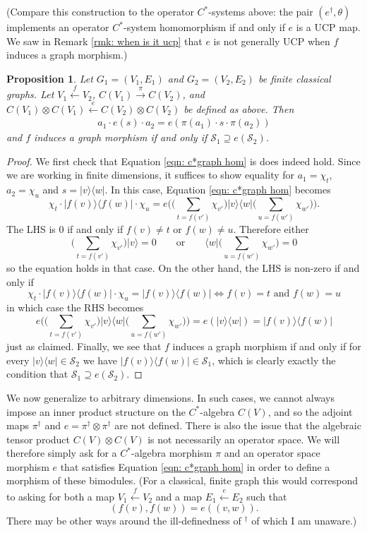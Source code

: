 \documentclass[12pt]{article}
\newtheorem{proposition}[theorem]{Proposition}
\theoremstyle{definition}
\newcommand{\mc}[1]{\mathcal{#1}}
\newcommand{\<}{\langle}
\renewcommand{\>}{\rangle}
\begin{document}
(Compare this construction to the operator $C^*$-systems above: the pair $(e^\dagger, \theta)$ implements an operator $C^*$-system homomorphism if and only if $e$ is a UCP map. We saw in Remark \ref{rmk: when is it ucp} that $e$ is not generally UCP when $f$ induces a graph morphism.)
\begin{proposition}
        Let $G_1 = (V_1, E_1)$ and $G_2 = (V_2, E_2)$ be finite classical graphs. Let $V_1 \overset{f}{\leftarrow} V_2$, $C(V_1) \overset{\pi}{\to} C(V_2)$, and $ C(V_1) \otimes C(V_1) \overset{e}{\leftarrow}  C(V_2) \otimes C(V_2)$ be defined as above. Then 
        \begin{align} \label{eqn: c*graph hom}
        a_1 \cdot e(s) \cdot a_2 = e(\pi(a_1) \cdot s \cdot \pi(a_2))
        \end{align}
        and $f$ induces a graph morphism if and only if $\mc S_1 \supseteq e(\mc S_2)$.
\end{proposition}
\begin{proof}
    We first check that Equation \ref{eqn: c*graph hom} is does indeed hold. Since we are working in finite dimensions, it suffices to show equality for $a_1 = \chi_t$, $a_2 = \chi_u$ and $s = |v\>\<w|$. In this case, Equation \ref{eqn: c*graph hom} becomes
    \[
    \chi_t \cdot |f(v)\>\<f(w)| \cdot \chi_u = e\bigg( \bigg( \sum_{t = f(v')} \chi_{v'}  \bigg) |v\>\<w| \bigg( \sum_{u = f(w')} \chi_{w'}\bigg)\bigg).
    \]
    The LHS is 0 if and only if $f(v) \ne t$ or $f(w) \ne u$. Therefore either 
    \[
    \bigg(\sum_{t = f(v')} \chi_{v'}  \bigg) |v\> = 0 \qquad \text{or} \qquad \<w| \bigg( \sum_{u = f(w')} \chi_{w'}\bigg) = 0
    \]
    so the equation holds in that case. On the other hand, the LHS is non-zero if and only if 
    \[
     \chi_t \cdot |f(v)\>\<f(w)| \cdot \chi_u =  |f(v)\>\<f(w)| \iff f(v) = t \text{ and } f(w) = u
    \]
    in which case the RHS becomes 
    \[
    e\bigg( \bigg( \sum_{t = f(v')} \chi_{v'}  \bigg) |v\>\<w| \bigg( \sum_{u = f(w')} \chi_{w'}\bigg)\bigg) = e(|v\>\<w|) = |f(v)\>\<f(w)|
    \]
    just as claimed. Finally, we see that $f$ induces a graph morphism if and only if for every $|v\>\<w| \in \mc S_2$ we have $|f(v)\>\<f(w)| \in \mc S_1$, which is clearly exactly the condition that $\mc S_1 \supseteq e(\mc S_2)$.
\end{proof}

We now generalize to arbitrary dimensions. In such cases, we cannot always impose an inner product structure on the $C^*$-algebra $C(V)$, and so the adjoint maps $\pi^\dagger$ and $e = \pi^\dagger \otimes \pi^\dagger$ are not defined. There is also the issue that the algebraic tensor product $C(V) \otimes C(V)$ is not necessarily an operator space. We will therefore simply ask for a $C^*$-algebra morphism $\pi$ and an operator space morphism $e$ that satisfies Equation \ref{eqn: c*graph hom} in order to define a morphism of these bimodules. (For a classical, finite graph this would correspond to asking for both a map $V_1 \overset f \leftarrow V_2$ and a map $E_1 \overset e \leftarrow E_2$ such that
\[
(f(v), f(w)) = e((v,w)).
\]
There may be other ways around the ill-definedness of $^\dagger$ of which I am unaware.)
\end{document}
